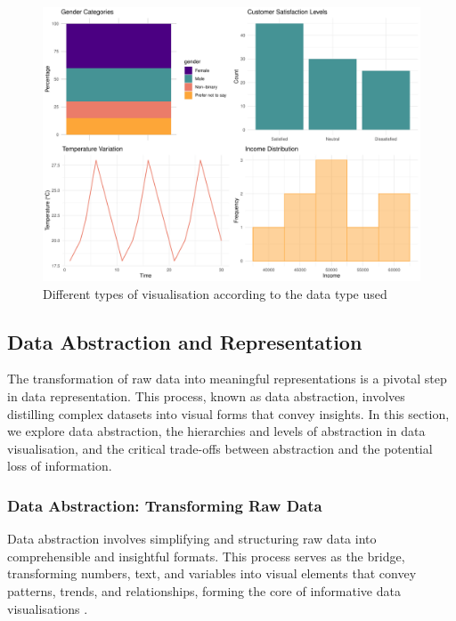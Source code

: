 \documentclass{article}\usepackage[]{graphicx}\usepackage[]{xcolor}
\makeatletter
\def\maxwidth{ %
  \ifdim\Gin@nat@width>\linewidth
    \linewidth
  \else
    \Gin@nat@width
  \fi
}
\newenvironment{knitrout}{}{} %
\makeatother
\begin{document}
\begin{knitrout}\scriptsize
{}\color{fgcolor}\begin{figure}[H]

{\centering \includegraphics[width=\maxwidth]{figure/beamer-data-plots-1} 

}

\caption[Different types of visualisation according to the data type used]{Different types of visualisation according to the data type used}\label{fig:data-plots}
\end{figure}

\end{knitrout}



\subsection{Data Abstraction and Representation}
The transformation of raw data into meaningful representations is a pivotal step in data representation. This process, known as data abstraction, involves distilling complex datasets into visual forms that convey insights. In this section, we explore data abstraction, the hierarchies and levels of abstraction in data visualisation, and the critical trade-offs between abstraction and the potential loss of information.

\subsubsection{Data Abstraction: Transforming Raw Data}
Data abstraction involves simplifying and structuring raw data into comprehensible and insightful formats. This process serves as the bridge, transforming numbers, text, and variables into visual elements that convey patterns, trends, and relationships, forming the core of informative data visualisations \cite{tufte2001visual}.
\end{document}
